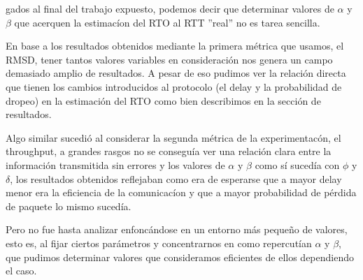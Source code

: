 gados al final del trabajo expuesto, podemos decir que determinar valores 
de $\alpha$ y $\beta$ que acerquen la estimac\'ion del RTO al RTT ''real'' no es tarea sencilla.

En base a los resultados obtenidos mediante la primera m\'etrica que usamos, el RMSD, tener 
tantos valores variables en consideraci\'on nos genera un campo demasiado amplio de resultados.
A pesar de eso pudimos ver la relaci\'on directa que tienen los cambios introducidos al
protocolo (el delay y la probabilidad de dropeo) en la estimaci\'on del RTO como bien describimos
en la secci\'on de resultados.

Algo similar sucedi\'o al considerar la segunda m\'etrica de la experimentac\'on, el throughput,
a grandes rasgos no se consegu\'ia ver una relaci\'on clara entre la informaci\'on transmitida  sin errores y los valores de $\alpha$ y $\beta$ como s\'i suced\'ia con $\phi$ y $\delta$, los resultados obtenidos reflejaban como era de esperarse que a mayor delay menor era la eficiencia de la comunicac\'ion y que a mayor probabilidad de p\'erdida de paquete lo mismo suced\'ia.

Pero no fue hasta analizar enfonc\'andose en un entorno m\'as peque\~no de valores, esto es,
al fijar ciertos par\'ametros y concentrarnos en como repercut\'ian $\alpha$ y $\beta$, que pudimos determinar valores que consideramos eficientes de ellos dependiendo el caso.

